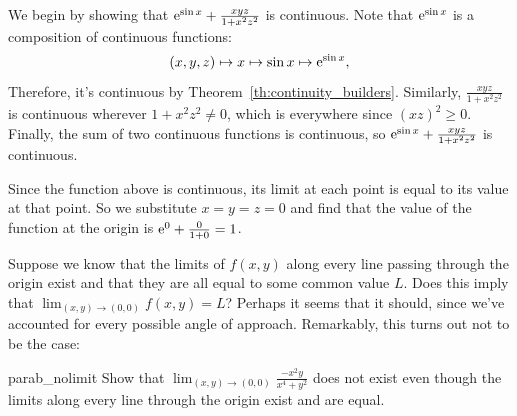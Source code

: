 \documentclass{watsonbook}
\begin{document}
\begin{solution}
  We begin by showing that $\mathrm{e}^{\sin x} + \frac{xyz}{1 + x^2 z^2}$ is
  continuous.  Note that $\mathrm{e}^{\sin x}$ is a composition of continuous
  functions: 
  \[
    (x,y,z) \mapsto x \mapsto \sin x \mapsto \mathrm{e}^{\sin x}, 
  \]
  Therefore, it's continuous by Theorem~\ref{th:continuity_builders}. Similarly,
  $\frac{xyz}{1 + x^2 z^2}$ is continuous wherever $1 + x^2 z^2 \neq
  0$, which is everywhere since $(xz)^2 \geq 0$. Finally, the sum of
  two continuous functions is continuous, so $\mathrm{e}^{\sin x} +
  \frac{xyz}{1 + x^2 z^2}$ is continuous.

  Since the function above is continuous, its limit at each point is
  equal to its value at that point. So we substitute $x=y=z=0$ and
  find that the value of the function at the origin is
  $\mathrm{e}^0 + \frac{0}{1+0} = 1$.
\end{solution}

Suppose we know that the limits of $f(x,y)$ along every line
passing through the origin exist and that they are all equal to some
common value $L$. Does this imply that
$\lim_{(x,y) \to (0,0)}f(x,y) = L$? Perhaps it seems that it should,
since we've accounted for every possible angle of
approach. Remarkably, this turns out not to be the case:

\begin{example}{}{parab_nolimit}
  Show that $\lim_{(x,y) \to (0,0)}\frac{-x^2 y }{x^4 + y^2}$ does not
  exist even though the limits along every line through the origin
  exist and are equal. 
\end{example}
\end{document}
